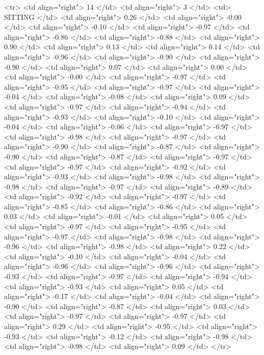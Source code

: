   <tr> <td align="right"> 14 </td> <td align="right">   3 </td> <td> SITTING </td> <td align="right"> 0.26 </td> <td align="right"> -0.00 </td> <td align="right"> -0.10 </td> <td align="right"> -0.97 </td> <td align="right"> -0.86 </td> <td align="right"> -0.88 </td> <td align="right"> 0.90 </td> <td align="right"> 0.13 </td> <td align="right"> 0.14 </td> <td align="right"> -0.96 </td> <td align="right"> -0.90 </td> <td align="right"> -0.90 </td> <td align="right"> 0.07 </td> <td align="right"> 0.00 </td> <td align="right"> -0.00 </td> <td align="right"> -0.97 </td> <td align="right"> -0.95 </td> <td align="right"> -0.97 </td> <td align="right"> -0.04 </td> <td align="right"> -0.08 </td> <td align="right"> 0.09 </td> <td align="right"> -0.97 </td> <td align="right"> -0.94 </td> <td align="right"> -0.93 </td> <td align="right"> -0.10 </td> <td align="right"> -0.04 </td> <td align="right"> -0.06 </td> <td align="right"> -0.97 </td> <td align="right"> -0.98 </td> <td align="right"> -0.97 </td> <td align="right"> -0.90 </td> <td align="right"> -0.87 </td> <td align="right"> -0.90 </td> <td align="right"> -0.87 </td> <td align="right"> -0.97 </td> <td align="right"> -0.97 </td> <td align="right"> -0.92 </td> <td align="right"> -0.93 </td> <td align="right"> -0.98 </td> <td align="right"> -0.98 </td> <td align="right"> -0.97 </td> <td align="right"> -0.89 </td> <td align="right"> -0.92 </td> <td align="right"> -0.97 </td> <td align="right"> -0.85 </td> <td align="right"> -0.86 </td> <td align="right"> 0.03 </td> <td align="right"> -0.01 </td> <td align="right"> 0.05 </td> <td align="right"> -0.97 </td> <td align="right"> -0.95 </td> <td align="right"> -0.97 </td> <td align="right"> -0.98 </td> <td align="right"> -0.96 </td> <td align="right"> -0.98 </td> <td align="right"> 0.22 </td> <td align="right"> -0.10 </td> <td align="right"> -0.04 </td> <td align="right"> -0.96 </td> <td align="right"> -0.96 </td> <td align="right"> -0.93 </td> <td align="right"> -0.97 </td> <td align="right"> -0.94 </td> <td align="right"> -0.93 </td> <td align="right"> 0.05 </td> <td align="right"> -0.17 </td> <td align="right"> -0.04 </td> <td align="right"> -0.90 </td> <td align="right"> -0.87 </td> <td align="right"> 0.03 </td> <td align="right"> -0.97 </td> <td align="right"> -0.97 </td> <td align="right"> 0.29 </td> <td align="right"> -0.95 </td> <td align="right"> -0.93 </td> <td align="right"> -0.12 </td> <td align="right"> -0.98 </td> <td align="right"> -0.98 </td> <td align="right"> 0.09 </td> </tr>
